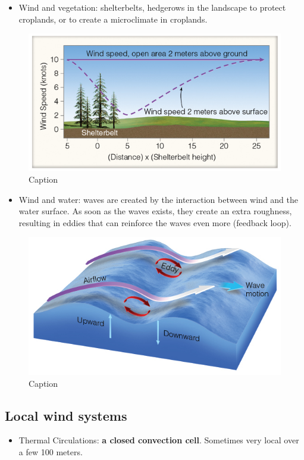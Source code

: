 \documentclass[oneside]{book}
\providecommand{\tightlist}{%
  \setlength{\itemsep}{0pt}\setlength{\parskip}{0pt}}
\begin{document}
\begin{itemize}
\tightlist
\item
  Wind and vegetation: shelterbelts, hedgerows in the landscape to
  protect croplands, or to create a microclimate in croplands.
\end{itemize}

\begin{figure}

{\centering \includegraphics[width=0.4\linewidth]{figures/Figure422} 

}

\caption{Caption}\label{fig:Vegetation}
\end{figure}

\begin{itemize}
\tightlist
\item
  Wind and water: waves are created by the interaction between wind and
  the water surface. As soon as the waves exists, they create an extra
  roughness, resulting in eddies that can reinforce the waves even more
  (feedback loop).
\end{itemize}

\begin{figure}

{\centering \includegraphics[width=0.6\linewidth]{figures/Figure423} 

}

\caption{Caption}\label{fig:Water}
\end{figure}

\subsection{Local wind systems}\label{local-wind-systems}

\begin{itemize}
\tightlist
\item
  Thermal Circulations: \textbf{a closed convection cell}. Sometimes
  very local over a few 100 meters.
\end{itemize}
\end{document}
